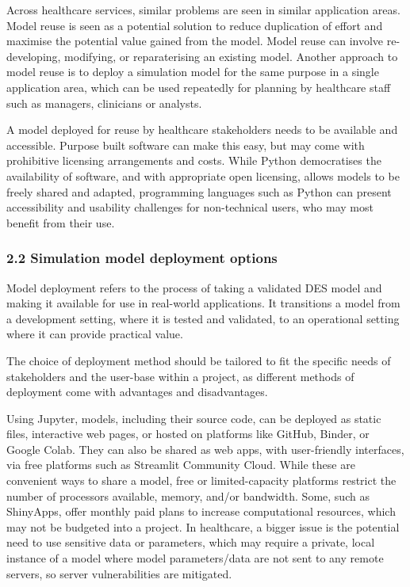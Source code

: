 \documentclass[
  letterpaper,
  DIV=11,
  numbers=noendperiod]{scrreprt}
\begin{document}
Across healthcare services, similar problems are seen in similar
application areas. Model reuse is seen as a potential solution to reduce
duplication of effort and maximise the potential value gained from the
model. Model reuse can involve re-developing, modifying, or
reparaterising an existing model. Another approach to model reuse is to
deploy a simulation model for the same purpose in a single application
area, which can be used repeatedly for planning by healthcare staff such
as managers, clinicians or analysts.

A model deployed for reuse by healthcare stakeholders needs to be
available and accessible. Purpose built software can make this easy, but
may come with prohibitive licensing arrangements and costs. While Python
democratises the availability of software, and with appropriate open
licensing, allows models to be freely shared and adapted, programming
languages such as Python can present accessibility and usability
challenges for non-technical users, who may most benefit from their use.

\subsubsection{2.2 Simulation model deployment
options}\label{simulation-model-deployment-options}

Model deployment refers to the process of taking a validated DES model
and making it available for use in real-world applications. It
transitions a model from a development setting, where it is tested and
validated, to an operational setting where it can provide practical
value.

The choice of deployment method should be tailored to fit the specific
needs of stakeholders and the user-base within a project, as different
methods of deployment come with advantages and disadvantages.

Using Jupyter, models, including their source code, can be deployed as
static files, interactive web pages, or hosted on platforms like GitHub,
Binder, or Google Colab. They can also be shared as web apps, with
user-friendly interfaces, via free platforms such as Streamlit Community
Cloud. While these are convenient ways to share a model, free or
limited-capacity platforms restrict the number of processors available,
memory, and/or bandwidth. Some, such as ShinyApps, offer monthly paid
plans to increase computational resources, which may not be budgeted
into a project. In healthcare, a bigger issue is the potential need to
use sensitive data or parameters, which may require a private, local
instance of a model where model parameters/data are not sent to any
remote servers, so server vulnerabilities are mitigated.
\end{document}
